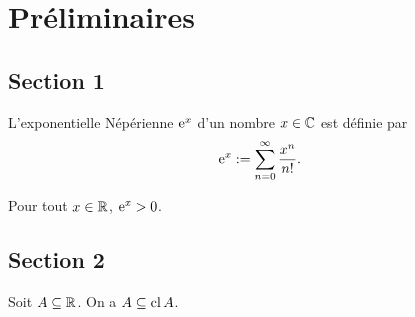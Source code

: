 \chapter{Préliminaires}
\label{ch:prelim}


\section{Section 1}

\begin{definition}
  \label{def:expo}
  L'exponentielle Népérienne $\e^x$ d'un nombre $x \in \IC$ est
  définie par
  \begin{equation}
    \label{eq:exp}
    \e^x := \sum_{n=0}^\infty \frac{x^n}{n!}.
  \end{equation}
\end{definition}

\begin{proposition}
  \label{pos-expo}
  Pour tout $x \in \IR$, $\e^x > 0$.
\end{proposition}


\section{Section 2}

\begin{lemma}
  \label{closure}
  Soit $A \subseteq \IR$.  On a $A \subseteq \cl A$.
\end{lemma}



\endinput
